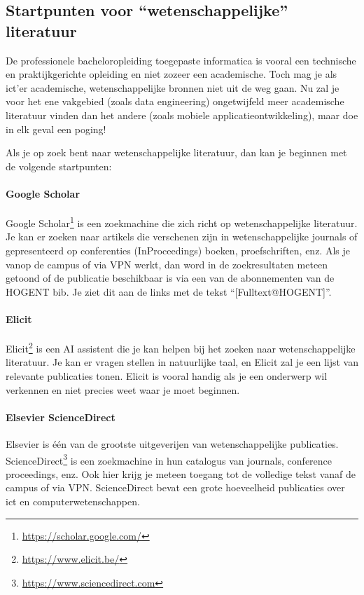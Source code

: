 \subsection{Startpunten voor ``wetenschappelijke'' literatuur}%
\label{ssec:startpunten-wetenschappelijke-literatuur}

De professionele bacheloropleiding toegepaste informatica is vooral een technische en praktijkgerichte opleiding en niet zozeer een academische. Toch mag je als ict'er academische, wetenschappelijke bronnen niet uit de weg gaan. Nu zal je voor het ene vakgebied (zoals data engineering) ongetwijfeld meer academische literatuur vinden dan het andere (zoals mobiele applicatieontwikkeling), maar doe in elk geval een poging!

Als je op zoek bent naar wetenschappelijke literatuur, dan kan je beginnen met de volgende startpunten:

\paragraph{Google Scholar}

Google Scholar\footnote{\url{https://scholar.google.com/}} is een zoekmachine die zich richt op wetenschappelijke literatuur. Je kan er zoeken naar artikels die verschenen zijn in wetenschappelijke journals of gepresenteerd op conferenties (InProceedings) boeken, proefschriften, enz. Als je vanop de campus of via VPN werkt, dan word in de zoekresultaten meteen getoond of de publicatie beschikbaar is via een van de abonnementen van de HOGENT bib. Je ziet dit aan de links met de tekst ``[Fulltext@HOGENT]''.

\paragraph{Elicit}

Elicit\footnote{\url{https://www.elicit.be/}} is een AI assistent die je kan helpen bij het zoeken naar wetenschappelijke literatuur. Je kan er vragen stellen in natuurlijke taal, en Elicit zal je een lijst van relevante publicaties tonen. Elicit is vooral handig als je een onderwerp wil verkennen en niet precies weet waar je moet beginnen.

\paragraph{Elsevier ScienceDirect}

Elsevier is één van de grootste uitgeverijen van wetenschappelijke publicaties. ScienceDirect\footnote{\url{https://www.sciencedirect.com}} is een zoekmachine in hun catalogus van journals, conference proceedings, enz. Ook hier krijg je meteen toegang tot de volledige tekst vanaf de campus of via VPN. ScienceDirect bevat een grote hoeveelheid publicaties over ict en computerwetenschappen.

